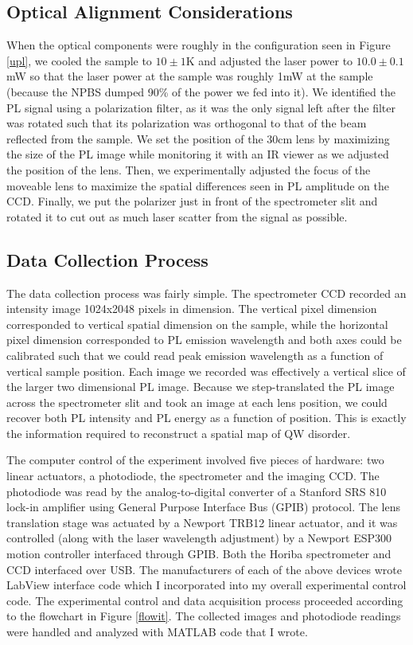 \subsection{Optical Alignment Considerations}
\indent When the optical components were roughly in the configuration seen in Figure \ref{upl}, we cooled the sample to $10\pm1$K and adjusted the laser power to $10.0\pm0.1$mW so that the laser power at the sample was roughly 1mW at the sample (because the NPBS dumped 90\% of the power we fed into it). We identified the PL signal using a polarization filter, as it was the only signal left after the filter was rotated such that its polarization was orthogonal to that of the beam reflected from the sample. We set the position of the 30cm lens by maximizing the size of the PL image while monitoring it with an IR viewer as we adjusted the position of the lens. Then, we experimentally adjusted the focus of the moveable lens to maximize the spatial differences seen in PL amplitude on the CCD. Finally, we put the polarizer just in front of the spectrometer slit and rotated it to cut out as much laser scatter from the signal as possible.

\subsection{Data Collection Process}
\indent The data collection process was fairly simple. The spectrometer CCD recorded an intensity image 1024x2048 pixels in dimension. The vertical pixel dimension corresponded to vertical spatial dimension on the sample, while the horizontal pixel dimension corresponded to PL emission wavelength and both axes could be calibrated such that we could read peak emission wavelength as a function of vertical sample position. Each image we recorded was effectively a vertical slice of the larger two dimensional PL image. Because we step-translated the PL image across the spectrometer slit and took an image at each lens position, we could recover both PL intensity and PL energy as a function of position. This is exactly the information required to reconstruct a spatial map of QW disorder. 

\indent The computer control of the experiment involved five pieces of hardware: two linear actuators, a photodiode, the spectrometer and the imaging CCD. The photodiode was read by the analog-to-digital converter of a Stanford SRS 810 lock-in amplifier using General Purpose Interface Bus (GPIB) protocol. The lens translation stage was actuated by a Newport TRB12 linear actuator, and it was controlled (along with the laser wavelength adjustment) by a Newport ESP300 motion controller interfaced through GPIB. Both the Horiba spectrometer and CCD interfaced over USB. The manufacturers of each of the above devices wrote LabView interface code which I incorporated into my overall experimental control code. The experimental control and data acquisition process proceeded according to the flowchart in Figure \ref{flowit}. The collected images and photodiode readings were handled and analyzed with MATLAB code that I wrote.




